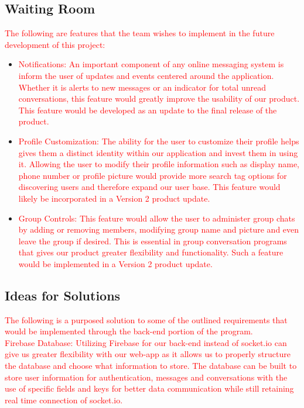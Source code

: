 \documentclass[12pt, titlepage]{article}
\begin{document}
    	\subsection{Waiting Room}
   	\textcolor{red}{The following are features that the team wishes to implement in the future development of this project:}\\
   	
   	\begin{itemize}
   		\item \textcolor{red}{Notifications: An important component of any online messaging system is inform the user of updates and events centered around the application. Whether it is alerts to new messages or an indicator for total unread conversations, this feature would greatly improve the usability of our product. This feature would be developed as an update to the final release of the product.}
   		\item \textcolor{red}{Profile Customization: The ability for the user to customize their profile helps gives them a distinct identity within our application and invest them in using it. Allowing the user to modify their profile information such as display name, phone number or profile picture would provide more search tag options for discovering users and therefore expand our user base. This feature would likely be incorporated in a Version 2 product update.}
   		\item \textcolor{red}{Group Controls: This feature would allow the user to administer group chats by adding or removing members, modifying group name and picture and even leave the group if desired. This is essential in group conversation programs that gives our product greater flexibility and functionality. Such a feature would be implemented in a Version 2 product update.}
   	\end{itemize}

    	\subsection{Ideas for Solutions}

	\textcolor{red}{The following is a purposed solution to some of the outlined requirements that would be implemented through the back-end portion of the program.}\\  	
    	
    \textcolor{red}{Firebase Database: Utilizing Firebase for our back-end instead of socket.io can give us greater flexibility with our web-app as it allows us to properly structure the database and choose what information to store. The database can be built to store user information for authentication, messages and conversations with the use of specific fields and keys for better data communication while still retaining real time connection of socket.io.}
\end{document}
